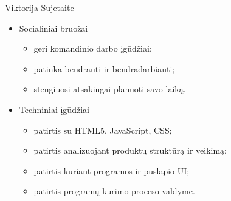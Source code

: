 \documentclass[11pt]{article}
\begin{document}
	Viktorija Sujetaite
	\begin{itemize}
		\item Socialiniai bruožai
		\begin{itemize}
			\item geri komandinio darbo įgūdžiai;
			\item patinka bendrauti ir bendradarbiauti;
			\item stengiuosi atsakingai planuoti savo laiką.
		\end{itemize}
		\item Techniniai įgūdžiai
		\begin{itemize}
			\item patirtis su HTML5, JavaScript, CSS;
			\item patirtis analizuojant produktų struktūrą ir veikimą;
			\item patirtis kuriant programos ir puslapio UI;
			\item patirtis programų kūrimo proceso valdyme.
		\end{itemize}
	\end{itemize}
\end{document}
